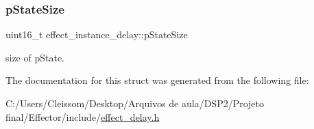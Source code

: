 \subsubsection{\texorpdfstring{p\+State\+Size}{pStateSize}}
{\footnotesize\ttfamily uint16\+\_\+t effect\+\_\+instance\+\_\+delay\+::p\+State\+Size}

size of p\+State. 

The documentation for this struct was generated from the following file\+:\begin{DoxyCompactItemize}
\item 
C\+:/\+Users/\+Cleissom/\+Desktop/\+Arquivos de aula/\+D\+S\+P2/\+Projeto final/\+Effector/include/\mbox{\hyperlink{effect__delay_8h}{effect\+\_\+delay.\+h}}\end{DoxyCompactItemize}
